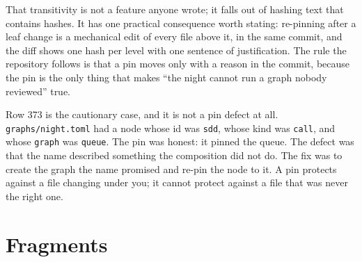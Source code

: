 \begin{center}
\end{center}

That transitivity is not a feature anyone wrote; it falls out of hashing text that contains hashes.
It has one practical consequence worth stating: re-pinning after a leaf change is a mechanical edit
of every file above it, in the same commit, and the diff shows one hash per level with one sentence
of justification. The rule the repository follows is that a pin moves only with a reason in the
commit, because the pin is the only thing that makes \enquote{the night cannot run a graph nobody
reviewed} true.

Row 373 is the cautionary case, and it is not a pin defect at all. \texttt{graphs/night.toml} had a
node whose id was \texttt{sdd}, whose kind was \texttt{call}, and whose \texttt{graph} was
\texttt{queue}. The pin was honest: it pinned the queue. The defect was that the name described
something the composition did not do. The fix was to create the graph the name promised and re-pin
the node to it. A pin protects against a file changing under you; it cannot protect against a file
that was never the right one.

\section{Fragments}

